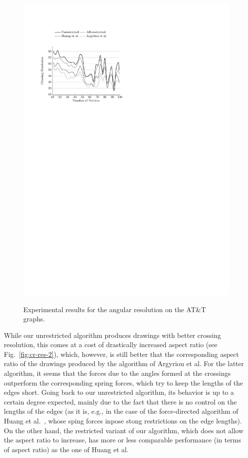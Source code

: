 \documentclass{comjnl}
\begin{document}
\begin{figure}[t!]
{	\includegraphics[scale=0.99,page=12]{figures/north}}
	\caption{Experimental results for the angular resolution on the AT\&T graphs.}
	\label{fig:northAngular}
\end{figure}



While our unrestricted algorithm produces drawings with better crossing resolution, this comes at a cost of drastically increased aspect ratio (see Fig.~\ref{fig:cr-res-2}), which, however, is still better that the corresponding aspect ratio of the drawings produced by the algorithm of Argyriou et al. For the latter algorithm, it seems that the forces due to the angles formed at the crossings outperform the corresponding spring forces, which try to keep the lengths of the edges short. Going back to our unrestricted algorithm, its behavior is up to a certain degree expected, mainly due to the fact that there is no control on the lengths of the edges (as it is, e.g., in the case of the force-directed algorithm of Huang et al.~\cite{DBLP:journals/vlc/HuangEHL13}, whose sping forces inpose stong restrictions on the edge lengths). On the other hand, the restricted variant of our algorithm, which does not allow the aspect ratio to increase, has more or less comparable performance (in terms of aspect ratio) as the one of Huang et al.
\end{document}
